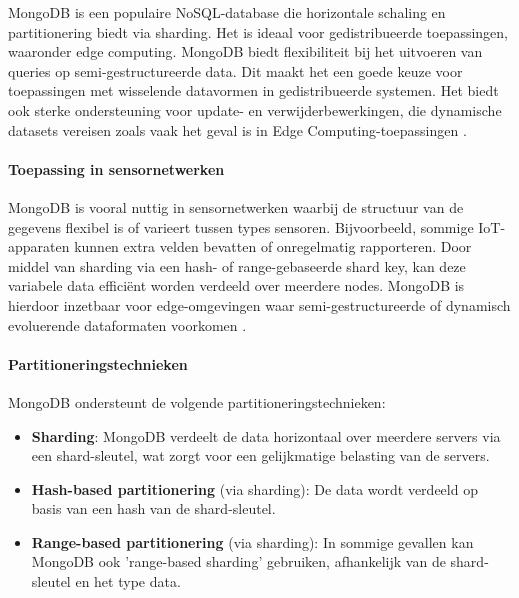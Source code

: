 MongoDB is een populaire NoSQL-database die horizontale schaling en partitionering biedt via sharding. Het is ideaal voor gedistribueerde toepassingen, waaronder edge computing. MongoDB biedt flexibiliteit bij het uitvoeren van queries op semi-gestructureerde data. Dit maakt het een goede keuze voor toepassingen met wisselende datavormen in gedistribueerde systemen. Het biedt ook sterke ondersteuning voor update- en verwijderbewerkingen, die dynamische datasets vereisen zoals vaak het geval is in Edge Computing-toepassingen \autocite{MongoDBDocumentation}.

\paragraph{Toepassing in sensornetwerken}  
MongoDB is vooral nuttig in sensornetwerken waarbij de structuur van de gegevens flexibel is of varieert tussen types sensoren. Bijvoorbeeld, sommige IoT-apparaten kunnen extra velden bevatten of onregelmatig rapporteren. Door middel van sharding via een hash- of range-gebaseerde shard key, kan deze variabele data efficiënt worden verdeeld over meerdere nodes. MongoDB is hierdoor inzetbaar voor edge-omgevingen waar semi-gestructureerde of dynamisch evoluerende dataformaten voorkomen \autocite{MongoDBDocumentation, Mahmud2020}.

\paragraph{Partitioneringstechnieken}  
MongoDB ondersteunt de volgende partitioneringstechnieken:
\begin{itemize}
    \item \textbf{Sharding}: MongoDB verdeelt de data horizontaal over meerdere servers via een shard-sleutel, wat zorgt voor een gelijkmatige belasting van de servers.
    \item \textbf{Hash-based partitionering} (via sharding): De data wordt verdeeld op basis van een hash van de shard-sleutel.
    \item \textbf{Range-based partitionering} (via sharding): In sommige gevallen kan MongoDB ook 'range-based sharding' gebruiken, afhankelijk van de shard-sleutel en het type data.
\end{itemize}

